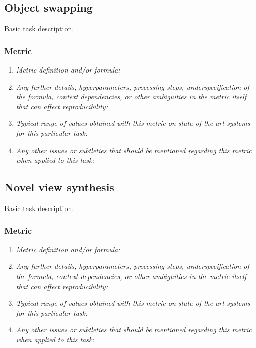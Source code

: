 \documentclass[a4paper,11pt]{article}
\begin{document}
    \subsection{Object swapping}
        Basic task description.
        \subsubsection{Metric}
            \begin{enumerate}[label=\alph*.]
                \item \textit{Metric definition and/or formula:}
                \bigskip
                \item \textit{Any further details, hyperparameters, processing steps, underspecification of the formula, context dependencies, or other ambiguities in the metric itself that can affect reproducibility:}
                \bigskip
                \item \textit{Typical range of values obtained with this metric on state-of-the-art systems for this particular task:}
                \bigskip
                \item \textit{Any other issues or subtleties that should be mentioned regarding this metric when applied to this task:}
                \bigskip
            \end{enumerate}

    \subsection{Novel view synthesis} \label{novel_view_synthesis}
    Basic task description.
    \subsubsection{Metric}
        \begin{enumerate}[label=\alph*.]
            \item \textit{Metric definition and/or formula:}
            \bigskip
            \item \textit{Any further details, hyperparameters, processing steps, underspecification of the formula, context dependencies, or other ambiguities in the metric itself that can affect reproducibility:}
            \bigskip
            \item \textit{Typical range of values obtained with this metric on state-of-the-art systems for this particular task:}
            \bigskip
            \item \textit{Any other issues or subtleties that should be mentioned regarding this metric when applied to this task:}
            \bigskip
        \end{enumerate}
\end{document}
